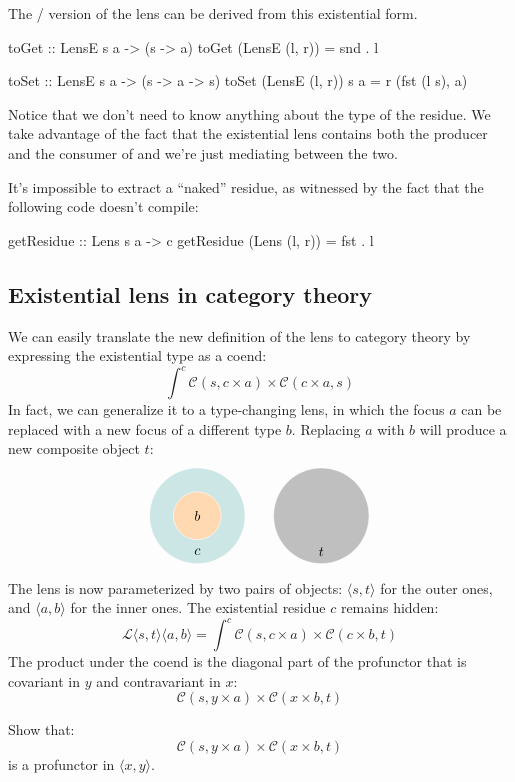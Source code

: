 \documentclass[DaoFP]{subfiles}
\begin{document}
The / version of the lens can be derived from this existential form.
\begin{haskell}
toGet :: LensE s a -> (s -> a)
toGet (LensE (l, r)) = snd . l

toSet :: LensE s a -> (s -> a -> s)
toSet (LensE (l, r)) s a = r (fst (l s), a)
\end{haskell}

Notice that we don't need to know anything about the type of the residue. We take advantage of the fact that the existential lens contains both the producer and the consumer of  and we're just mediating between the two.

It's impossible to extract a ``naked'' residue, as witnessed by the fact that the following code doesn't compile:
\begin{haskell}
getResidue :: Lens s a -> c
getResidue (Lens (l, r)) = fst . l
\end{haskell}

\subsection{Existential lens in category theory}

We can easily translate the new definition of the lens to category theory by expressing the existential type as a coend:
\[ \int^{c} \mathcal{C}(s, c \times a) \times  \mathcal{C}(c \times a, s) \]
In fact, we can generalize it to a type-changing lens, in which the focus $a$ can be replaced with a new focus of a different type $b$. Replacing $a$ with $b$ will produce a new composite object $t$:
\[
\begin{tikzpicture}
\filldraw[fill=blue!50!green!20, draw=white] (0, 0) circle (1.2);
\filldraw[fill=orange!30, draw=white] (0, 0) circle (0.6);
\node at (0, 0) {$b$};
\node at (0, -0.9) {$c$};
\end{tikzpicture}
\hspace{20pt}
\begin{tikzpicture}
\filldraw[fill=gray!50, draw=white] (0, 0) circle (1.2);
\node at (0, -0.9) {$t$};
\end{tikzpicture}
\]

The lens is now parameterized by two pairs of objects: $\langle s, t\rangle$ for the outer ones, and $ \langle a, b \rangle$ for the inner ones. The existential residue $c$ remains hidden:
\[ \mathcal{L}\langle s, t\rangle \langle a, b \rangle = \int^{c} \mathcal{C}(s, c \times a) \times  \mathcal{C}(c \times b, t) \]
The product under the coend is the diagonal part of the profunctor that is covariant in $y$ and contravariant in $x$:
\[ \mathcal{C}(s, y \times a) \times  \mathcal{C}(x \times b, t) \]
\begin{exercise}
Show that:
\[ \mathcal{C}(s, y \times a) \times  \mathcal{C}(x \times b, t) \]
is a profunctor in $\langle x, y\rangle$.
\end{exercise}
\end{document}
